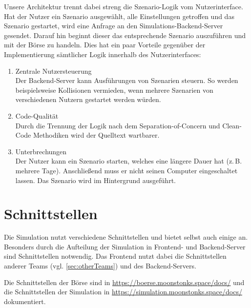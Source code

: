 Unsere Architektur trennt dabei streng die Szenario-Logik vom Nutzerinterface.
Hat der Nutzer ein Szenario ausgewählt, alle Einstellungen getroffen und das Szenario gestartet, wird eine Anfrage an den Simulations-Backend-Server gesendet. Darauf hin beginnt dieser das entsprechende Szenario auszuführen und mit der Börse zu handeln.
Dies hat ein paar Vorteile gegenüber der Implementierung sämtlicher Logik innerhalb des Nutzerinterfaces:
\begin{enumerate}
    \item Zentrale Nutzersteuerung\\
        Der Backend-Server kann Ausführungen von Szenarien steuern. So werden beispielsweise Kollisionen vermieden, wenn mehrere Szenarien von verschiedenen Nutzern gestartet werden würden.
    \item Code-Qualität\\
        Durch die Trennung der Logik nach dem Separation-of-Concern und Clean-Code Methodiken wird der Quelltext wartbarer.
    \item Unterbrechungen\\
        Der Nutzer kann ein Szenario starten, welches eine längere Dauer hat (z.\,B. mehrere Tage). Anschließend muss er nicht seinen Computer eingeschaltet lassen. Das Szenario wird im Hintergrund ausgeführt.
\end{enumerate}

\section{Schnittstellen}
Die Simulation nutzt verschiedene Schnittstellen und bietet selbst auch einige an. Besonders durch die Aufteilung der Simulation in Frontend- und Backend-Server sind Schnittstellen notwendig.
Das Frontend nutzt dabei die Schnittstellen anderer Teams (vgl. \autoref{sec:otherTeams}) und des Backend-Servers.

Die Schnittstellen der Börse sind in \href{https://boerse.moonstonks.space/docs/}{https://boerse.moonstonks.space/docs/} und die Schnittstellen der Simulation in \href{https://simulation.moonstonks.space/docs/}{https://simulation.moonstonks.space/docs/} dokumentiert.

